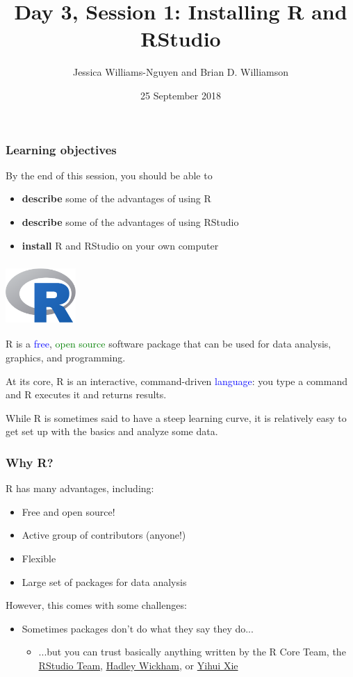 \documentclass[11pt]{beamer}
\title{Day 3, Session 1: Installing R and RStudio}
\author{Jessica Williams-Nguyen and Brian D. Williamson}
\institute{EPI/BIOST Bootcamp 2018}
\date{25 September 2018}
\newcommand{\myframe}[1]{\begin{frame} \frametitle{#1}}
\newenvironment{spaceitemize}
{ \begin{itemize}
    \setlength{\itemsep}{10pt}
    \setlength{\parskip}{0pt}
    \setlength{\parsep}{0pt}     }
{ \end{itemize}                  }
\begin{document}
\begin{frame}
\titlepage
\end{frame}

\begin{frame}
\frametitle{Learning objectives}
By the end of this session, you should be able to
\begin{itemize}
\item \textbf{describe} some of the advantages of using R
\item \textbf{describe} some of the advantages of using RStudio
\item \textbf{install} R and RStudio on your own computer
\end{itemize}
\end{frame}

\myframe{\includegraphics[width = 0.2\textwidth]{figs/Rlogo.png}}
R is a \textcolor{blue}{free}, \textcolor{green}{open source} software package that can be used for data analysis, graphics, and programming. \pause

At its core, R is an interactive, command-driven \textcolor{blue}{language}: you type a command and R executes it and returns results. \pause

While R is sometimes said to have a steep learning curve, it is relatively easy to get set up with the basics and analyze some data.
\end{frame}

\myframe{Why R?}
R has many advantages, including: \pause
\begin{spaceitemize}
\item Free and open source! \pause
\item Active group of contributors (anyone!) \pause
\item Flexible \pause
\item Large set of packages for data analysis \pause
\end{spaceitemize}

However, this comes with some challenges: \pause
\begin{spaceitemize}
\item Sometimes packages don't do what they say they do... \pause
\begin{itemize}
\item ...but you can trust basically anything written by the R Core Team, the \href{https://www.rstudio.com/products/rpackages/}{RStudio Team}, \href{http://hadley.nz/}{Hadley Wickham}, or \href{https://github.com/yihui}{Yihui Xie}
\end{itemize}
\end{spaceitemize}
\end{frame}
\end{document}
